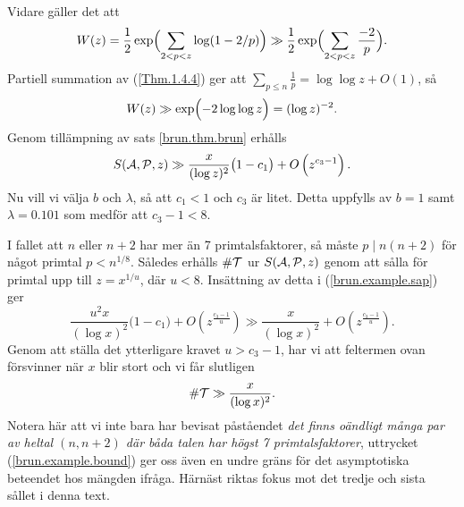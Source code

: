 Vidare gäller det att 
\begin{align*}
    W(z) = \frac{1}{2}\exp\Bigl(\sum_{2<p<z} \log(1-2/p) \Bigr) 
    \gg \frac{1}{2}\exp\Bigl(\sum_{2<p<z} \frac{-2}{p} \Bigr).
\end{align*}
Partiell summation av (\ref{Thm.1.4.4}) ger att $\sum_{p\leq n}\frac{1}{p} = \log\log z + O(1)$, så
\begin{align*}
    W(z) \gg \exp\Bigl(-2\log\log z\Bigr)
    = (\log z)^{-2}.
\end{align*}
Genom tillämpning av sats \ref{brun.thm.brun} erhålls
\begin{equation} \label{brun.example.sap}
    \S{A}{P}{z} \gg \frac{x}{(\log z)^2}\bigl(1 - c_1\bigr) + O\left(z^{c_3 - 1}\right).
\end{equation}
Nu vill vi välja $b$ och $\lambda$, så att $c_1<1$ och $c_3$ är litet. 
Detta uppfylls av $b=1$ samt $\lambda=0.101$ som medför att $c_3-1<8$.

I fallet att $n$ eller $n+2$ har mer än 7 primtalsfaktorer,
så måste $p\mid n(n+2)$ för något primtal $p < n^{1/8}$.
Således erhålls $\card\mathcal{T}$ ur $\S{A}{P}{z}$ genom att sålla för primtal upp till $z = x^{1/u}$, där $u<8$.
Insättning av detta i (\ref{brun.example.sap}) ger
\begin{equation*}
    \frac{u^2x}{(\log x)^2}\bigl(1 - c_1\bigr) + O\left(z^{\frac{c_3 - 1}{u}}\right) \gg 
    \frac{x}{(\log x)^2} + O\left(z^{\frac{c_3 - 1}{u}}\right).
\end{equation*}
Genom att ställa det ytterligare kravet $u>c_3-1$, har vi att feltermen ovan försvinner när $x$ blir stort och vi får slutligen
\begin{equation} \label{brun.example.bound}
    \card\mathcal{T} \gg \frac{x}{(\log x)^2}.
\end{equation}
Notera här att vi inte bara har bevisat påståendet \textit{det finns oändligt många par av heltal $(n,n+2)$ där båda talen har högst 7 primtalsfaktorer},
uttrycket (\ref{brun.example.bound}) ger oss även en undre gräns för det asymptotiska beteendet hos mängden ifråga.
Härnäst riktas fokus mot det tredje och sista sållet i denna text.




